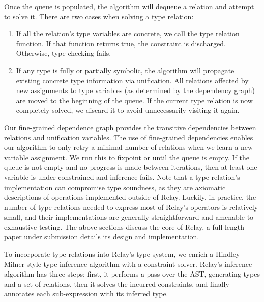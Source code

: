   Once the queue is populated, the algorithm will dequeue a relation and attempt to solve it.
  There are two cases when solving a type relation:
  \begin{enumerate}
    \item If all the relation's type variables
    are concrete, we call the type relation function. If that function returns true, the
    constraint is discharged. Otherwise, type checking fails.
    \item If any type is fully or partially symbolic, the
      algorithm will propagate
      existing concrete type information via unification.
    All relations affected by new assignments to type
      variables (as determined by the dependency graph)
      are moved to the beginning of the queue.
    If the current type relation is now completely solved, we
    discard it to avoid unnecessarily visiting it again.
  \end{enumerate}

  Our fine-grained dependence graph provides the transitive dependencies
    between relations and unification variables.
  The use of fine-grained dependencies enables our algorithm to
    only retry a minimal number of relations when we
    learn a new variable assignment.
  We run this to fixpoint or until the queue is empty.
  If the queue is not empty and no progress is made between iterations,
    then at least one variable is under constrained and inference fails.
  Note that a type relation's implementation can
    compromise type soundness, as they are axiomatic descriptions
    of operations implemented outside of Relay.
  Luckily, in practice, the number of type relations needed to express most of Relay's
    operators is relatively small, and their implementations are generally straightforward
    and amenable to exhaustive testing.
The above sections discuss the core of Relay, a full-length paper under submission\citep{roesch2019relay}
  details its design and implementation.

  To incorporate type relations into Relay's type system, we enrich
    a Hindley-Milner-style type inference algorithm with
    a constraint solver.
  Relay's inference algorithm has three steps: first, it
    performs a pass over the AST, generating types and a set of relations,
    then it solves the incurred constraints,
    and finally annotates each sub-expression with its inferred type.


